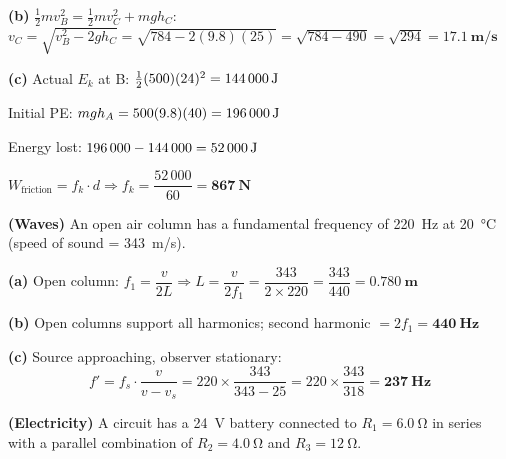 \documentclass[addpoints]{exam}
\begin{document}
\begin{questions}
\begin{solution}[9cm]
\textbf{(b)} $\tfrac{1}{2}mv_B^2 = \tfrac{1}{2}mv_C^2 + mgh_C$:\quad
$v_C = \sqrt{v_B^2 - 2gh_C} = \sqrt{784 - 2(9.8)(25)} = \sqrt{784-490} = \sqrt{294}
= \mathbf{\SI{17.1}{m/s}}$

\textbf{(c)} Actual $E_k$ at B: $\tfrac{1}{2}(500)(24)^2 = \SI{144\,000}{J}$

Initial PE: $mgh_A = 500(9.8)(40) = \SI{196\,000}{J}$

Energy lost: $196\,000 - 144\,000 = \mathbf{\SI{52\,000}{J}}$

$W_\text{friction} = f_k \cdot d \Rightarrow f_k = \dfrac{52\,000}{60} = \mathbf{\SI{867}{N}}$
\end{solution}

\question \textbf{(Waves)} An open air column has a fundamental frequency of
\SI{220}{Hz} at \SI{20}{\celsius} (speed of sound = \SI{343}{m/s}).
\begin{solution}[8cm]
\textbf{(a)} Open column: $f_1 = \dfrac{v}{2L} \Rightarrow L = \dfrac{v}{2f_1}
= \dfrac{343}{2 \times 220} = \dfrac{343}{440} = \mathbf{\SI{0.780}{m}}$

\textbf{(b)} Open columns support all harmonics; second harmonic $= 2f_1 = \mathbf{\SI{440}{Hz}}$

\textbf{(c)} Source approaching, observer stationary:
\[
f' = f_s \cdot \frac{v}{v - v_s} = 220 \times \frac{343}{343-25}
= 220 \times \frac{343}{318} = \mathbf{\SI{237}{Hz}}
\]
\end{solution}

\question \textbf{(Electricity)} A circuit has a \SI{24}{V} battery connected to $R_1 =
\SI{6.0}{\ohm}$ in series with a parallel combination of $R_2 = \SI{4.0}{\ohm}$ and
$R_3 = \SI{12}{\ohm}$.
\begin{parts}

\end{parts}
\end{questions}
\end{document}
